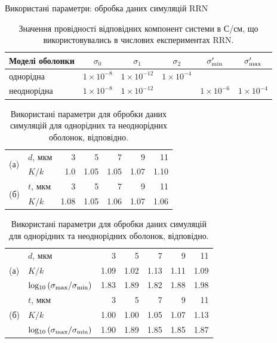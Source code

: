 \documentclass[10pt]{beamer}
\begin{document}
\begin{frame}{Використані параметри: обробка даних симуляцій RRN}
\footnotesize

\begin{table}[bt]
	\begin{center}%
		\caption{\label{tab:RRN-exper-params} Значення провідності відповідних компонент системи в С/см, що використовувались в числових експериментах RRN.}\vspace{-10pt}
		\begin{tabular}{|l|c|c|c|c|c|}
			\hline
			Моделі оболонки  & $\sigma_0$ & $\sigma_1$ & $\sigma_2$ & $\sigma_{\rm min}^\prime$ & $\sigma_{\rm max}^\prime$ \\
			\hline
			однорідна  & $1\times 10^{-8}$ & $1\times 10^{-12}$ & $1\times 10^{-4}$     & & \\
			\hline
			неоднорідна  & $1\times 10^{-8}$ & $1\times 10^{-12}$ &   & $1\times 10^{-6}$ & $1\times 10^{-4}$\\
			\hline
		\end{tabular}
	\end{center}
\end{table}

\begin{table}[htb]
	\centering
	\caption{Використані параметри для обробки даних симуляцій для однорідних та неоднорідних оболонок, відповідно.}\vspace{-10pt}
	\label{tab:numerical-homogeneous}
	\begin{tabular}{|l|l|r|r|r|r|r|}
		\hline
		\multirow{2}{*}{(а)} & $d$, мкм & 3 & 5 & 7 & 9 & 11 \\ \cline{2-7} 
		& $K/k$ & 1.0 & 1.05 & 1.05 & 1.07 & 1.10 \\ \hline
		\multirow{2}{*}{(б)} & $t$, мкм & 3 & 5 & 7 & 9 & 11 \\ \cline{2-7} 
		& $K/k$ & 1.08 & 1.05 & 1.06 & 1.07 & 1.06 \\ \hline
	\end{tabular}
	
		\begin{tabular}{|l|l|r|r|r|r|r|}
			\hline
			\multirow{3}{*}{(а)} & $d$, мкм & 3    & 5    & 7     & 9     & 11    \\ \cline{2-7}
			& $K/k$    & 1.09 & 1.02 & 1.13  & 1.11  & 1.09   \\ 
			\cline{2-7}
			& ${\rm log_{10}}\left(\sigma_{\rm max}/\sigma_{\rm min}\right)$
			& 1.83 & 1.89 & 1.82 & 1.88 & 1.98\\
			\hline
			\multirow{3}{*}{(б)} & $t$, мкм & 3    & 5    & 7     & 9     & 11    \\ \cline{2-7}
			& $K/k$    & 1.00  & 1.00  & 1.05 & 1.07 & 1.13  \\ \cline{2-7}
			& ${\rm log_{10}}\left(\sigma_{\rm max}/\sigma_{\rm min}\right)$
			& 1.90  & 1.89  & 1.85 & 1.85 & 1.87 \\
			\hline
		\end{tabular}
\end{table}

\end{frame}
\end{document}
